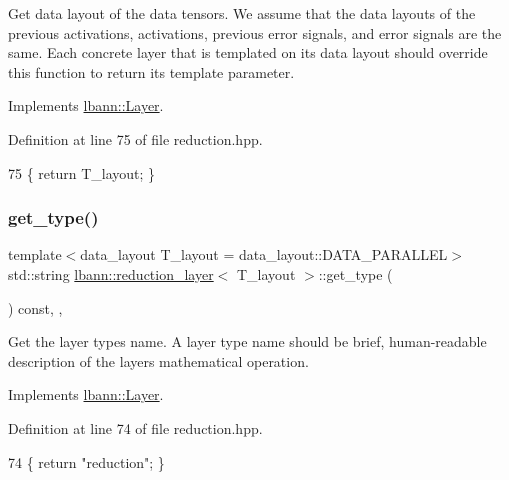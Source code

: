 Get data layout of the data tensors. We assume that the data layouts of the previous activations, activations, previous error signals, and error signals are the same. Each concrete layer that is templated on its data layout should override this function to return its template parameter. 

Implements \hyperlink{classlbann_1_1Layer_a5dfb66e81fc085997402a5e2241316bd}{lbann\+::\+Layer}.



Definition at line 75 of file reduction.\+hpp.


\begin{DoxyCode}
75 \{ \textcolor{keywordflow}{return} T\_layout; \}
\end{DoxyCode}
\mbox{\label{classlbann_1_1reduction__layer_a442261c36971a6f7188d58eba50ef798}} 
\subsubsection{\texorpdfstring{get\+\_\+type()}{get\_type()}}
{\footnotesize\ttfamily template$<$data\+\_\+layout T\+\_\+layout = data\+\_\+layout\+::\+D\+A\+T\+A\+\_\+\+P\+A\+R\+A\+L\+L\+EL$>$ \\
std\+::string \hyperlink{classlbann_1_1reduction__layer}{lbann\+::reduction\+\_\+layer}$<$ T\+\_\+layout $>$\+::get\+\_\+type (\begin{DoxyParamCaption}{ }\end{DoxyParamCaption}) const\hspace{0.3cm}{\ttfamily [inline]}, {\ttfamily [override]}, {\ttfamily [virtual]}}

Get the layer type\textquotesingle{}s name. A layer type name should be brief, human-\/readable description of the layer\textquotesingle{}s mathematical operation. 

Implements \hyperlink{classlbann_1_1Layer_a0fa0ea9160b490c151c0a17fde4f7239}{lbann\+::\+Layer}.



Definition at line 74 of file reduction.\+hpp.


\begin{DoxyCode}
74 \{ \textcolor{keywordflow}{return} \textcolor{stringliteral}{"reduction"}; \}
\end{DoxyCode}
\mbox{\label{classlbann_1_1reduction__layer_aff2c5f6112da848908baba3645408e6e}} 
